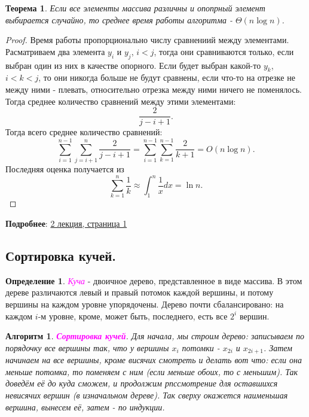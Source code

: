\documentclass[a4paper]{article}
\theoremstyle{indented}
\newtheorem{theorem}{Теорема}
\newtheorem{alg}{Алгоритм}
\theoremstyle{definition}
\newtheorem{defn}{Определение}
\theoremstyle{remark}
\begin{document}
\begin{theorem}
    Если все элементы массива различны и опопрный элемент выбирается случайно, то среднее время работы алгоритма - $\Theta(n\log n)$.
\end{theorem}

\begin{proof}
    Время работы пропорционально числу сравнениий между элементами. Расматриваем два элемента $y_i$ и $y_j$, $i<j$, тогда они сравниваются только, если выбран один из них в качестве опорного. Если будет выбран какой-то $y_k$, $i<k<j$, то они никогда больше не будут сравнены, если что-то на отрезке не между ними - плевать, относительно отрезка между ними ничего не поменялось. Тогда среднее количество сравнений между этими элементами: 
    \[
        \frac{2}{j-i+1}. 
    \]
    Тогда всего среднее количество сравнений: 
    \[
        \sum_{i=1}^{n-1}\sum_{j=i+1}^n \frac{2}{j-i+1} = \sum_{i=1}^{n-1}\sum_{k=1}^{n-1} \frac{2}{k+1}= O(n\log n).
    \]
    Последняя оценка получается из
    \[
        \sum_{k=1}^n\frac{1}{k} \approx \int_1^n \frac{1}{x}dx = \ln n. 
    \]
\end{proof}

\textbf{Подробнее}: \href{https://users.math-cs.spbu.ru/~okhotin/teaching/algorithms_2020/okhotin_algorithms_2020_l2.pdf}{2 лекция, страница 1}

\subsection{Сортировка кучей.}

\begin{defn}
    \textcolor{magenta}{\hypertarget{d1.5}{\textit{Куча}}} - двоичное дерево, представленное в виде массива. В этом дереве различаются левый и правый потомок каждой вершины, и потому вершины на каждом уровне упорядочены. Дерево почти сбалансировано: на каждом $i$-м уровне, кроме, может быть, последнего, есть все $2^i$ вершин.
\end{defn}

\begin{alg}
    \textcolor{magenta}{\hypertarget{t2}{\textbf{Сортировка кучей}}}. Для начала, мы строим дерево: записываем по порядочку все вершины так, что у вершины $x_i$ потомки - $x_{2i}$ и $x_{2i+1}$. Затем начинаем на все вершины, кроме висячих смотреть и делать вот что: если она меньше потомка, то поменяем с ним (если меньше обоих, то с меньшим). Так доведём её до куда сможем, и продолжим рпссмотрение для оставшихся невисячих вершин (в изначальном дереве). Так сверху окажется наименьшая вершина, вынесем её, затем - по индукции.
\end{alg}
\end{document}
